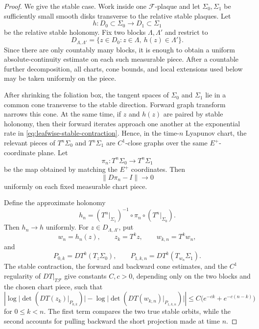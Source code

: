 \documentclass[10pt,a4paper]{amsart}
\begin{document}
\begin{proof}
We give the stable case.  Work inside one $\mathcal F$-plaque and let
$\Sigma_0,\Sigma_1$ be sufficiently small smooth disks transverse to the
relative stable plaques.  Let
\[
 h:D_0\subset\Sigma_0\longrightarrow D_1\subset\Sigma_1
\]
be the relative stable holonomy.  Fix two blocks $\Lambda,\Lambda'$ and
restrict to
\[
 D_{\Lambda,\Lambda'}
 =\{z\in D_0:z\in\Lambda,\ h(z)\in\Lambda'\}.
\]
Since there are only countably many blocks, it is enough to obtain a uniform
absolute-continuity estimate on each such measurable piece.  After a
countable further decomposition, all charts, cone bounds, and local
extensions used below may be taken uniformly on the piece.

After shrinking the foliation box, the tangent spaces of $\Sigma_0$ and
$\Sigma_1$ lie in a common cone transverse to the stable direction.  Forward
graph transform narrows this cone.  At the same time, if $z$ and $h(z)$ are
paired by stable holonomy, then their forward iterates approach one another
at the exponential rate in \eqref{eq:leafwise-stable-contraction}.  Hence,
in the time-$n$ Lyapunov chart, the relevant pieces of
$T^n\Sigma_0$ and $T^n\Sigma_1$ are $C^1$-close graphs over the same
$E^+$-coordinate plane.  Let
\[
 \pi_n:T^n\Sigma_0\longrightarrow T^n\Sigma_1
\]
be the map obtained by matching the $E^+$ coordinates.  Then
\[
 \|D\pi_n-I\|\longrightarrow0
\]
uniformly on each fixed measurable chart piece.

Define the approximate holonomy
\[
 h_n=(T^n|_{\Sigma_1})^{-1}\circ\pi_n\circ(T^n|_{\Sigma_0}).
\]
Then $h_n\to h$ uniformly.  For $z\in D_{\Lambda,\Lambda'}$, put
\[
 w_n=h_n(z),\qquad z_k=T^kz,\qquad w_{k,n}=T^kw_n,
\]
and
\[
 P_{0,k}=DT^k(T_z\Sigma_0),
 \qquad
 P_{1,k,n}=DT^k(T_{w_n}\Sigma_1).
\]
The stable contraction, the forward and backward cone estimates, and the
$C^1$ regularity of $DT|_{T\mathcal F}$ give constants $C,c>0$, depending
only on the two blocks and the chosen chart piece, such that
\begin{equation}\label{eq:leafwise-distortion}
 \left|
 \log\bigl|\det(DT(z_k)|_{P_{0,k}})\bigr|
 -
 \log\bigl|\det(DT(w_{k,n})|_{P_{1,k,n}})\bigr|
 \right|
 \le C\bigl(e^{-ck}+e^{-c(n-k)}\bigr)
\end{equation}
for $0\le k<n$.  The first term compares the two true stable orbits, while
the second accounts for pulling backward the short projection made at time
$n$.


\end{proof}
\end{document}
